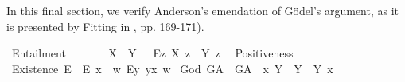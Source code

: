 %
\begin{isabellebody}%
%
%
%
%
%
%
%
%
\isamarkuptrue%
%
\begin{isamarkuptext}%
In this final section, we verify Anderson's emendation of G\"odel's argument, as it is presented
 by Fitting in \cite{Fitting}, pp. 169-171).%
\end{isamarkuptext}\isamarkuptrue%
\isamarkupfalse%
\ Entailment{\isacharcolon}{\isacharcolon}{\isachardoublequoteopen}{\isasymup}{\isasymlangle}{\isasymup}{\isasymlangle}{\isasymzero}{\isasymrangle}{\isacharcomma}{\isasymup}{\isasymlangle}{\isasymzero}{\isasymrangle}{\isasymrangle}{\isachardoublequoteclose}\ {\isacharparenleft}\ {\isachardoublequoteopen}{\isasymRrightarrow}{\isachardoublequoteclose}\ {}{}{\isacharparenright}\ \ %
\isanewline
\ \ {\isachardoublequoteopen}X\ {\isasymRrightarrow}\ Y\ {\isasymequiv}\ \ \isactrlbold {\isasymbox}{\isacharparenleft}\isactrlbold {\isasymforall}\isactrlsup Ez{\isachardot}\ X\ z\ \isactrlbold {\isasymrightarrow}\ Y\ z{\isacharparenright}{\isachardoublequoteclose}\ \isanewline
{}\isamarkupfalse%
\ Positiveness{\isacharcolon}{\isacharcolon}{\isachardoublequoteopen}{\isasymup}{\isasymlangle}{\isasymup}{\isasymlangle}{\isasymzero}{\isasymrangle}{\isasymrangle}{\isachardoublequoteclose}\ {\isacharparenleft}{\isachardoublequoteopen}{\isasymP}{\isachardoublequoteclose}{\isacharparenright}\isanewline
{}\isamarkupfalse%
\ Existence{\isacharcolon}{\isacharcolon}{\isachardoublequoteopen}{\isasymup}{\isasymlangle}{\isasymzero}{\isasymrangle}{\isachardoublequoteclose}\ {\isacharparenleft}{\isachardoublequoteopen}E{\isacharbang}{\isachardoublequoteclose}{\isacharparenright}\ \ {\isachardoublequoteopen}E{\isacharbang}\ x\ {\isasymequiv}\ {\isasymlambda}w{\isachardot}\ {\isacharparenleft}\isactrlbold {\isasymexists}\isactrlsup Ey{\isachardot}\ y\isactrlbold {\isasymapprox}x{\isacharparenright}\ w{\isachardoublequoteclose}\isanewline
{}\isamarkupfalse%
\ God{\isacharcolon}{\isacharcolon}{\isachardoublequoteopen}{\isasymup}{\isasymlangle}{\isasymzero}{\isasymrangle}{\isachardoublequoteclose}\ {\isacharparenleft}{\isachardoublequoteopen}G\isactrlsup A{\isachardoublequoteclose}{\isacharparenright}\ \ {\isachardoublequoteopen}G\isactrlsup A\ {\isasymequiv}\ {\isasymlambda}x{\isachardot}\ \isactrlbold {\isasymforall}Y{\isachardot}\ {\isacharparenleft}{\isasymP}\ Y{\isacharparenright}\ \isactrlbold {\isasymleftrightarrow}\ \isactrlbold {\isasymbox}{\isacharparenleft}Y\ x{\isacharparenright}{\isachardoublequoteclose}\ %

\end{isabellebody}
